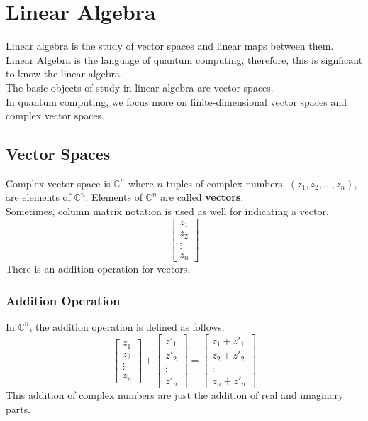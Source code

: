 \documentclass{article}
\begin{document}
\section{Linear Algebra}
Linear algebra is the study of vector spaces and linear maps between them. \\
Linear Algebra is the language of quantum computing, therefore, this is signficant to know the linear algebra. \\
The basic objects of study in linear algebra are vector spaces. \\
In quantum computing, we focus more on finite-dimensional vector spaces and complex vector spaces. \\
\subsection{Vector Spaces}
Complex vector space is $\mathbb{C}^n$ where $n$ tuples of complex numbers, $(z_1, z_2, ..., z_n)$, are elements of $\mathbb{C}^n$.
Elements of $\mathbb{C}^n$ are called \textbf{vectors}. \\
Sometimes, column matrix notation is used as well for indicating a vector. \\
\begin{equation}
\begin{bmatrix}
z_1 \\
z_2 \\
\vdots \\
z_n
\end{bmatrix}
\end{equation}
There is an addition operation for vectors. \\
\subsubsection{Addition Operation}
In $\mathbb{C}^n$, the addition operation is defined as follows. \\
\begin{equation}
\begin{bmatrix}
z_1 \\
z_2 \\
\vdots \\
z_n
\end{bmatrix}
+
\begin{bmatrix}
z'_1 \\
z'_2 \\
\vdots \\
z'_n
\end{bmatrix}
=
\begin{bmatrix}
z_1 + z'_1 \\
z_2 + z'_2 \\
\vdots \\
z_n + z'_n
\end{bmatrix}
\end{equation}
This addition of complex numbers are just the addition of real and imaginary parts. \\
\end{document}
